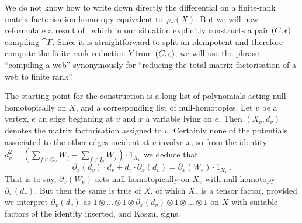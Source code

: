 \documentclass{compositio}
\theoremstyle{definition}
\numberwithin{equation}{section}
\begin{document}
We do not know how to write down directly the differential on a finite-rank matrix factorisation homotopy equivalent to $\varphi_*(X)$. But we will now reformulate a result of~\cite{dm1102.2957} which in our situation explicitly constructs a pair $(C, \epsilon)$ compiling $\cat{F}$. Since it is straightforward to split an idempotent and therefore compute the finite-rank reduction $Y$ from $(C, \epsilon)$, we will use the phrase ``compiling a web'' synonymously for ``reducing the total matrix factorisation of a web to finite rank''. 

The starting point for the construction is a long list of polynomials acting null-homotopically on $X$, and a corresponding list of null-homotopies. Let $v$ be a vertex, $e$ an edge beginning at $v$ and $x$ a variable lying on $e$. Then $(X_v, d_v)$ denotes the matrix factorisation assigned to $v$. Certainly none of the potentials associated to the other edges incident at $v$ involve $x$, so from the identity $d_v^2 = (\sum_{f \in O_v} W_f - \sum_{f \in I_v} W_f) \cdot 1_{X_v}$ we deduce that
\[
\partial_x(d_v) \cdot d_v + d_v \cdot \partial_x(d_v) = \partial_x(W_e) \cdot 1_{X_v}\,.
\]
That is to say, $\partial_x(W_e)$ acts null-homotopically on $X_v$ with null-homotopy $\partial_x(d_v)$. But then the same is true of $X$, of which $X_v$ is a tensor factor, provided we interpret $\partial_x(d_v)$ as $1 \otimes \ldots \otimes 1\otimes \partial_x(d_v) \otimes 1\otimes \ldots \otimes 1$ on $X$ with suitable factors of the identity inserted, and Koszul signs.
\end{document}
